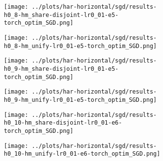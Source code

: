 \begin{figure}[htbp]  %
    \centering
    \begin{subfigure}[b]{0.47\textwidth}
        \centering
        \texttt{[image: ../plots/har-horizontal/sgd/results-h0\_8-hm\_share-disjoint-lr0\_01-e5-torch\_optim\_SGD.png]}
    \end{subfigure}
    \hfill
    \begin{subfigure}[b]{0.47\textwidth}
        \centering
        \texttt{[image: ../plots/har-horizontal/sgd/results-h0\_8-hm\_unify-lr0\_01-e5-torch\_optim\_SGD.png]}
    \end{subfigure}
\end{figure}
\begin{figure}[htbp]  %
    \centering
    \begin{subfigure}[b]{0.47\textwidth}
        \centering
        \texttt{[image: ../plots/har-horizontal/sgd/results-h0\_9-hm\_share-disjoint-lr0\_01-e5-torch\_optim\_SGD.png]}
    \end{subfigure}
    \hfill
    \begin{subfigure}[b]{0.47\textwidth}
        \centering
        \texttt{[image: ../plots/har-horizontal/sgd/results-h0\_9-hm\_unify-lr0\_01-e5-torch\_optim\_SGD.png]}
    \end{subfigure}
\end{figure}
\begin{figure}[htbp]  %
    \centering
    \begin{subfigure}[b]{0.47\textwidth}
        \centering
        \texttt{[image: ../plots/har-horizontal/sgd/results-h0\_10-hm\_share-disjoint-lr0\_01-e6-torch\_optim\_SGD.png]}
    \end{subfigure}
    \hfill
    \begin{subfigure}[b]{0.47\textwidth}
        \centering
        \texttt{[image: ../plots/har-horizontal/sgd/results-h0\_10-hm\_unify-lr0\_01-e6-torch\_optim\_SGD.png]}
    \end{subfigure}
\end{figure}


